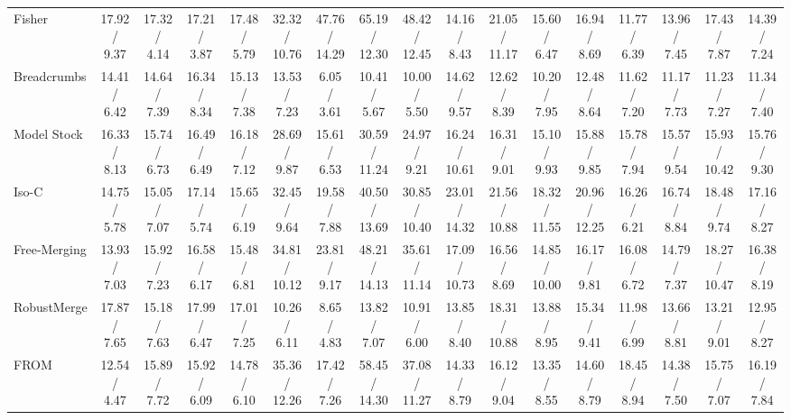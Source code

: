 \documentclass[letterpaper]{article} %
\newcommand{\pub}[1]{{\color{gray}{\footnotesize{[{#1}]}}}}
\begin{document}
\begin{table}[!t]
{\begin{tabular}{l||ccc:c|ccc:c|ccc:c|ccc:c}
Fisher\pub{NeurIPS 2022} & 17.92 / 9.37 & 17.32 / 4.14 & 17.21 / 3.87 & 17.48 / 5.79 & 32.32 / 10.76 & 47.76 / 14.29 & 65.19 / 12.30 & 48.42 / 12.45 & 14.16 / 8.43 & 21.05 / 11.17 & 15.60 / 6.47 & 16.94 / 8.69 & 11.77 / 6.39 & 13.96 / 7.45 & 17.43 / 7.87 & 14.39 / 7.24 \\

Breadcrumbs\pub{ECCV 2024} & 14.41 / 6.42 & 14.64 / 7.39 & 16.34 / 8.34 & 15.13 / 7.38 & 13.53 / 7.23 & 6.05 / 3.61 & 10.41 / 5.67 & 10.00 / 5.50 & 14.62 / 9.57 & 12.62 / 8.39 & 10.20 / 7.95 & 12.48 / 8.64 & 11.62 / 7.20 & 11.17 / 7.73 & 11.23 / 7.27 & 11.34 / 7.40 \\

Model Stock\pub{ECCV 2024} & 16.33 / 8.13 & 15.74 / 6.73 & 16.49 / 6.49 & 16.18 / 7.12 & 28.69 / 9.87 & 15.61 / 6.53 & 30.59 / 11.24 & 24.97 / 9.21 & 16.24 / 10.61 & 16.31 / 9.01 & 15.10 / 9.93 & 15.88 / 9.85 & 15.78 / 7.94 & 15.57 / 9.54 & 15.93 / 10.42 & 15.76 / 9.30 \\

Iso-C\pub{ICML 2025} & 14.75 / 5.78 & 15.05 / 7.07 & 17.14 / 5.74 & 15.65 / 6.19 & 32.45 / 9.64 & 19.58 / 7.88 & 40.50 / 13.69 & 30.85 / 10.40 & 23.01 / 14.32 & 21.56 / 10.88 & 18.32 / 11.55 & 20.96 / 12.25 & 16.26 / 6.21 & 16.74 / 8.84 & 18.48 / 9.74 & 17.16 / 8.27 \\

Free-Merging\pub{ICCV 2025} & 13.93 / 7.03 & 15.92 / 7.23 & 16.58 / 6.17 & 15.48 / 6.81 & 34.81 / 10.12 & 23.81 / 9.17 & 48.21 / 14.13 & 35.61 / 11.14 & 17.09 / 10.73 & 16.56 / 8.69 & 14.85 / 10.00 & 16.17 / 9.81 & 16.08 / 6.72 & 14.79 / 7.37 & 18.27 / 10.47 & 16.38 / 8.19 \\

RobustMerge\pub{NeurIPS 2025} & 17.87 / 7.65 & 15.18 / 7.63 & 17.99 / 6.47 & 17.01 / 7.25 & 10.26 / 6.11 & 8.65 / 4.83 & 13.82 / 7.07 & 10.91 / 6.00 & 13.85 / 8.40 & 18.31 / 10.88 & 13.88 / 8.95 & 15.34 / 9.41 & 11.98 / 6.99 & 13.66 / 8.81 & 13.21 / 9.01 & 12.95 / 8.27 \\

FROM\pub{AAAI 2026} & 12.54 / 4.47 & 15.89 / 7.72 & 15.92 / 6.09 & 14.78 / 6.10 & 35.36 / 12.26 & 17.42 / 7.26 & 58.45 / 14.30 & 37.08 / 11.27 & 14.33 / 8.79 & 16.12 / 9.04 & 13.35 / 8.55 & 14.60 / 8.79 & 18.45 / 8.94 & 14.38 / 7.50 & 15.75 / 7.07 & 16.19 / 7.84 \\


\end{tabular}}
\end{table}
\end{document}
